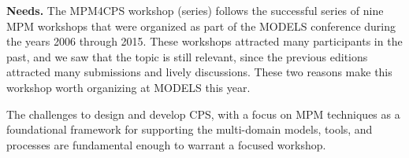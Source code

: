 \smallskip
\noindent
\textbf{Needs.}
%
The MPM4CPS workshop (series) follows the successful series of nine MPM workshops that 
were organized as part of the MODELS conference during the years 2006 through 2015.
These workshops attracted many participants in the past, and we saw that the topic
is still relevant, since the previous editions attracted many submissions and lively discussions.
These two reasons make this workshop worth organizing at MODELS this year.


The challenges to design and develop CPS, with a focus on MPM techniques as a 
foundational framework for supporting the multi-domain models, tools, and 
processes are fundamental enough to warrant a focused workshop.

